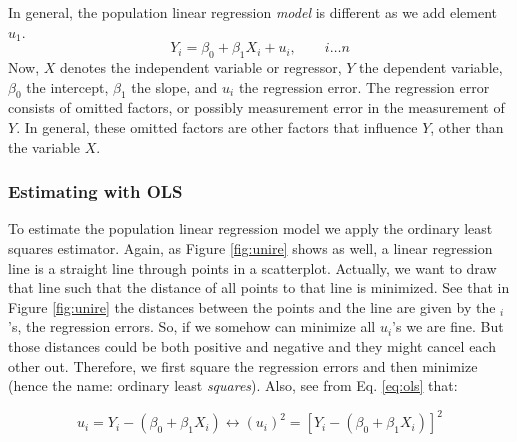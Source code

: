 \documentclass[
]{book}
\begin{document}
In general, the population linear regression \emph{model} is different as we add element \(u_1\).
\begin{equation}
    Y_i = \beta_0 + \beta_1 X_i + u_i, \qquad i\ldots n
    \label{eq:ols}
\end{equation}
Now, \(X\) denotes the independent variable or regressor, \(Y\) the dependent variable, \(\beta_0\) the intercept, \(\beta_1\) the slope, and \(u_i\) the regression error. The regression error consists of omitted factors, or possibly measurement error in the measurement of \(Y\). In general, these omitted factors are other factors that influence \(Y\), other than the variable \(X\).

\hypertarget{estimating-with-ols}{%
\subsubsection{Estimating with OLS}\label{estimating-with-ols}}

To estimate the population linear regression model we apply the ordinary least squares estimator. Again, as Figure \ref{fig:unire} shows as well, a linear regression line is a straight line through points in a scatterplot. Actually, we want to draw that line such that the distance of all points to that line is minimized. See that in Figure \ref{fig:unire} the distances between the points and the line are given by the \(_i\)'s, the regression errors. So, if we somehow can minimize all \(u_i\)'s we are fine. But those distances could be both positive and negative and they might cancel each other out. Therefore, we first square the regression errors and then minimize (hence the name: ordinary least \emph{squares}). Also, see from Eq. \eqref{eq:ols} that:

\begin{equation}
u_i = Y_i - (\beta_0 + \beta_1 X_i) \longleftrightarrow (u_i)^2 = \left[Y_i - (\beta_0 + \beta_1 X_i) \right]^2
\end{equation}
\end{document}

